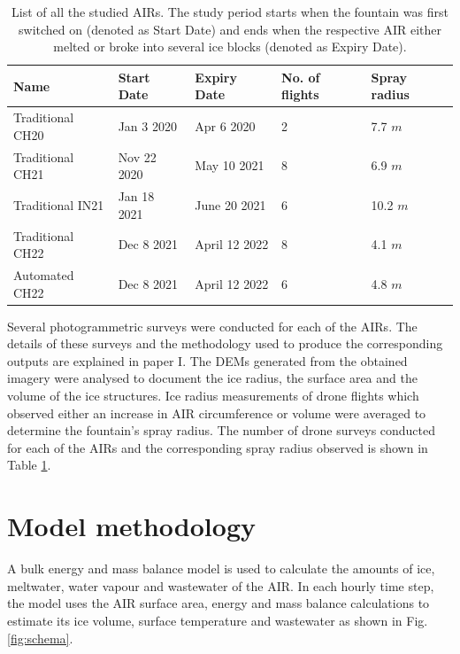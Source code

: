\begin{table}
	\centering
	\caption{List of all the studied \ac{AIRs}. The study period starts when the fountain was first switched on
		(denoted as Start Date) and ends when the respective AIR either melted or broke into several ice blocks
		(denoted as Expiry Date). }
	\label{tab:AIRs}
	\begin{tabular}{|lllll|}
		\hline
		\textbf{Name}    & \textbf{Start Date} & \textbf{Expiry Date} & \textbf{No. of flights} & \textbf{Spray
		radius}                                                                                                 \\ \hline
		Traditional CH20 & Jan 3 2020          & Apr 6 2020           & 2                       & 7.7 $m$       \\
		Traditional CH21 & Nov 22 2020         & May 10 2021          & 8                       & 6.9 $m$       \\
		Traditional IN21 & Jan 18 2021         & June 20 2021         & 6                       & 10.2 $m$      \\
		Traditional CH22 & Dec 8 2021          & April 12 2022        & 8                       & 4.1 $m$       \\
		Automated CH22   & Dec 8 2021          & April 12 2022        & 6                       & 4.8 $m$       \\ \hline
	\end{tabular}
\end{table}


Several photogrammetric surveys were conducted for each of the \ac{AIRs}. The details of these surveys and the
methodology used to produce the corresponding outputs are explained in paper I. The
\ac{DEMs} generated from the obtained imagery were analysed to document the ice radius, the surface area and the
volume of the ice structures. Ice radius measurements of drone flights which observed either an increase in AIR
circumference or volume were averaged to determine the fountain's spray radius. The number of drone surveys
conducted for each of the AIRs and the corresponding spray radius observed is shown in Table \ref{tab:AIRs}.

\section{Model methodology}

A bulk energy and mass balance model is used to calculate the amounts of ice, meltwater, water vapour and
wastewater of the AIR. In each hourly time step, the model uses the AIR surface area, energy and mass balance
calculations to estimate its ice volume, surface temperature and wastewater as shown in Fig. \ref{fig:schema}.


